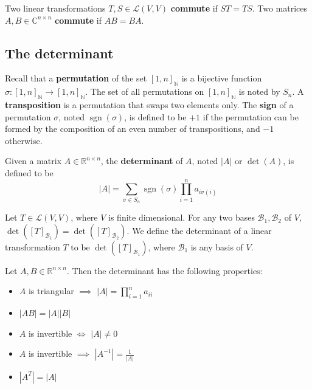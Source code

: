 \documentclass{bareminimum}
\DeclareMathOperator{\sgn}{sgn}
\begin{document}
	\begin{defn}[Commute]
		Two linear transformations $T,S \in \mathcal{L}(V,V)$  \textbf{commute} if $ST = TS$. Two matrices $A,B \in \mathbb{C}^{n \times n}$ \textbf{commute} if $AB = BA$.
	\end{defn}
	
	
	\subsection{The determinant}
	
	
	\begin{remark}
		Recall that a \textbf{permutation} of the set $[1,n]_{\mathbb{N}}$ is a bijective function $\sigma : [1,n]_{\mathbb{N}} \to [1,n]_{\mathbb{N}}$. The set of all permutations on $[1,n]_{\mathbb{N}}$ is noted by $S_n$. A \textbf{transposition} is a permutation that swaps two elements only. The \textbf{sign} of a permutation $\sigma$, noted $\sgn(\sigma)$, is defined to be $+1$ if the permutation can be formed by the composition of an even number of transpositions, and $-1$ otherwise.
	\end{remark}
	
	\begin{defn}
		Given a matrix $A \in \mathbb{R}^{n \times n}$, the \textbf{determinant}  of $A$, noted $|A|$ or $\det(A)$, is defined to be
		\begin{equation}
			|A| = \sum_{\sigma \in S_n} \sgn(\sigma) \prod_{i=1}^n a_{i\sigma(i)}
		\end{equation}
	\end{defn}
	
	\begin{prop}
		Let $T \in \mathcal{L}(V,V)$, where $V$ is finite dimensional. For any two bases $\mathcal{B}_1, \mathcal{B}_2$ of $V$, $\det([T]_{\mathcal{B}_1}) = \det([T]_{\mathcal{B}_2})$. We define the determinant of a linear transformation $T$ to be $\det([T]_{\mathcal{B}_1})$, where $\mathcal{B}_1$ is any basis of $V$.
	\end{prop}
	
	\begin{prop}
		Let $A, B \in \mathbb{R}^{n \times n}$. Then the determinant has the following properties:
		\begin{itemize}
			\item $A$ is triangular $\implies$ $|A| = \prod_{i=1}^n a_{ii}$
			\item $|AB| = |A||B|$
			\item $A$ is invertible $\iff$ $|A| \ne 0$
			\item $A$ is invertible $\implies$ $|A^{-1}| = \frac{1}{|A|}$
			\item $|A^T| = |A|$
		\end{itemize}
	\end{prop}
	
\end{document}
